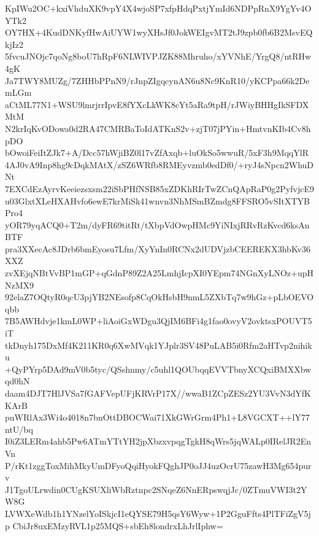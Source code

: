 KpIWu2OC+kxiVhduXK9vpY4X4wjoSP7xfpHdqPxtjYmId6NDPpRnX9YgYv4OYTk2
OY7HX+4KudDNKyfHwAiUYW1wyXHsJf0JokWEIgvMT2tJ9zpb0fb6B2MsvEQkjIz2
5fvcuJNOjc7qoNg8boU7hRpF6NLWIVPJZK88Mhruho/xYVNhE/YrgQ8/ntRHw4gK
Ja7TWY8MUZg/7ZHHbPPnN9/rJnpZIgqcynAN6u8Nc9KnR10/yKCPpa66k2DemLGm
aCtML77N1+WSU9lmrjrrIpvE8fYXcLkWK8cYt5aRa9tpH/rJWiyBHHgIkSFDXMtM
N2krIqKvODowa0d2RA47CMRBaToIdATKnS2v+zjT07jPYin+HmtvnKIb4Cv8hpDO
bOwoiFeiItZJk7+A/Dcc57hWjiBZ0l17vZfAxqb+luOkSo5wwuR/5xF3h9MqqYlR
4AJ0vA9Inp8hg9cDqkMAtX/zSZ6WRfb8RMEyvzmb0edDf0/+ryJ4sNpcn2WhuDNt
7EXCdEzAyrvKeeiezsxsm22iSbPHfNSB85xZDKhRIrTwZCnQApRaP0g2PyfvjcE9
u03GlxtXLeHXAHvfo6ewE7krMiSk41wnvn3NhMSmBZmdg8FFSRO5vSItXTYBPro4
yOR79yqACQ0+T2m/dyFR69titRt/tXbpVdOwpHMc9YiNIxjRRvRzKvcd6ksAnBTF
pra3XXecAc8JDrb6bmEyosu7Lfm/XyYnIn0RCNx2dUDVjzbCEEREKX3hbKv36XXZ
zvXEjqNBtVvBP1mGP+qGdnP89Z2A25LmhjIcpXI0YEpm74NGnXyLNOz+upHNzMX9
92elaZ7OQtyR0qcU3pjYB2NEsofp8CqOkHsbH9nmL5ZXbTq7w9hGz+pLbOEVOqbb
7B5AWHdvje1kmL0WP+liAoiGxWDgu3QjIM6BFi4g1fao0ovyV2ovktsxPOUVT5iT
tkDnyh175DxMf4K211KR0q6XwMVqk1YJplr3SV48PuLAB5i0Rfm2aHTvp2nihiku
+QyPYrp5DAd9mV0b5tyc/QSshnmy/c5uhl1QOUbqqEVVTbnyXCQxiBMXXbwqd0hN
daam4DJT7HlJVSa7fGAFVepUFjKRVrP17X//wwaB1ZCpZESz2YU3VvN3dYfKKArB
puWRlAx3Wi4o4018n7bnOttDBOCWai71XkGWrGrm4Ph1+L8VGCXT++lY77ntU/bq
I0iZ3LERm4ahb5Pw6ATmYTtYH2jpXbzxvpqgTgkH8qWrs5jqWALp0IRelJR2EnVn
P/rKt1zggToxMihMkyUmDFyoQqiHyokFQghJP0oJJ4uzOcrU75zawH3Mg654purv
J1TgoULrwdin0CUgKSUXliWbRztnpc2SNqeZ6NnERpswqjJc/0ZTmuVWI3t2YW8G
LVWXeWdb1h1YNzelYoISkjcI1eQYSE79H5qsY6Wyw+1P2GguFfts4PlTFiZgV5jp
CbiJr8uxEMzyRVL1p25MQS+sbEh8londrxLhJrlIphw=

